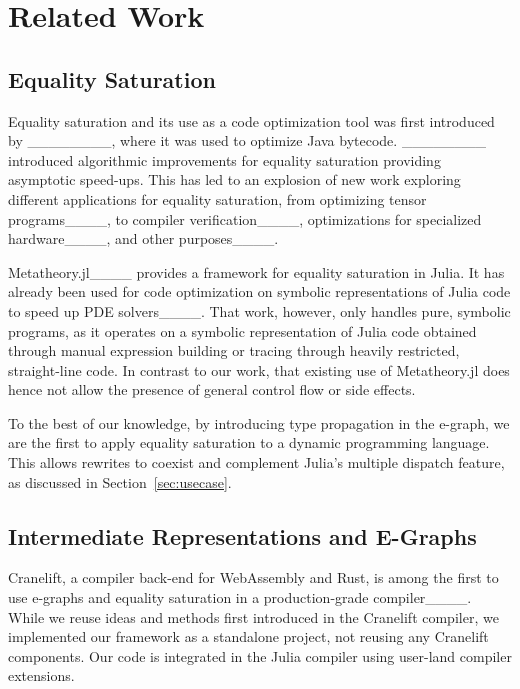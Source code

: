 \section{Related Work}
\label{sec:related work}
\subsection{Equality Saturation}
Equality saturation and its use as a code optimization tool was first introduced by ________, where it was used to optimize Java bytecode.
________ introduced algorithmic improvements for equality saturation providing asymptotic speed-ups.
This has led to an explosion of new work exploring different applications for equality saturation, from optimizing tensor programs____, to compiler verification____, optimizations for specialized hardware____, and other purposes____.

Metatheory.jl____ provides a framework for equality saturation in Julia.
It has already been used for code optimization on symbolic representations of Julia code to speed up PDE solvers____. That work, however, only handles pure, symbolic programs, as it operates on a symbolic representation of Julia code obtained through manual expression building or tracing through heavily restricted, straight-line code. In contrast to our work, that existing use of Metatheory.jl does hence not allow the presence of general control flow or side effects.

To the best of our knowledge, by introducing type propagation in the e-graph, we are the first to apply equality saturation to a dynamic programming language.
This allows rewrites to coexist and complement Julia's multiple dispatch feature, as discussed in Section~\ref{sec:usecase}.

\subsection{Intermediate Representations and E-Graphs}
Cranelift, a compiler back-end for WebAssembly and Rust, is among the first to use e-graphs and equality saturation in a production-grade compiler____. While we reuse ideas and methods first introduced in the Cranelift compiler, we implemented our framework as a standalone project, not reusing any Cranelift components. Our code is integrated in the Julia compiler using user-land compiler extensions.


